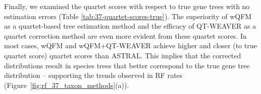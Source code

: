 \documentclass[runningheads]{llncs}
\begin{document}
Finally, we examined the quartet scores with respect to true gene trees with no estimation errors (Table \ref{tab:37-quartet-scores-true}). The superiority of wQFM as a quartet-based tree estimation method and the efficacy of QT-WEAVER as a quartet correction method are even more evident from these quartet scores. %
In most cases, wQFM and wQFM+QT-WEAVER achieve higher and closer (to true quartet score) quartet scores than ASTRAL. This implies that the corrected distributions result in species trees that better correspond to the true gene tree distribution -- supporting the trends observed in RF rates (Figure~\ref{fig:rf_37_taxon_methods}(a)). 







\end{document}
